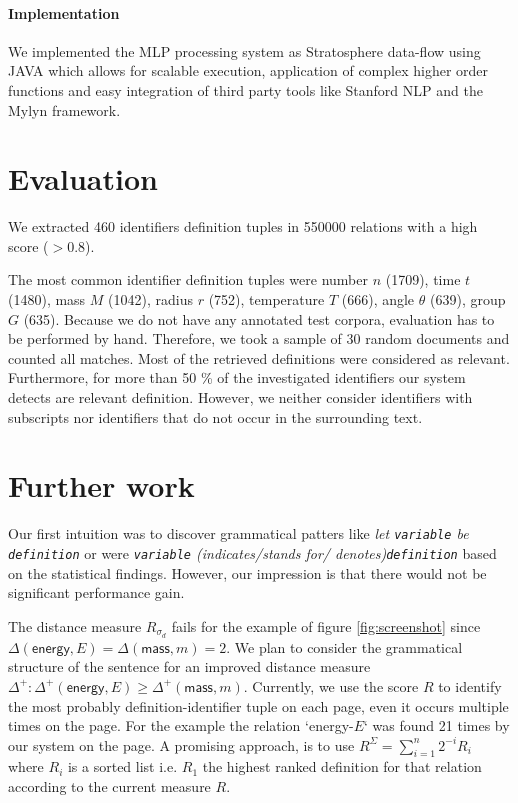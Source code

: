 \documentclass[runningheads]{llncs}
\begin{document}
\paragraph{Implementation}
We implemented the MLP processing system \cite{github} as Stratosphere data-flow using JAVA which allows for scalable execution, application of complex higher order functions and easy integration of third party tools like Stanford NLP and the Mylyn framework.
\section{Evaluation}
We extracted 460 identifiers definition tuples in 550000 relations with a
high score ($>0.8$).

The most common identifier definition tuples were 
number $n$ (1709), time $t$ (1480), mass $M$ (1042), radius $r$ (752), temperature	$T$	(666), angle $\theta$ (639), group $G$ (635).
Because we do not have any annotated test corpora,
evaluation has to be performed by hand.
Therefore, we took a sample of 30
random documents and counted all matches.
Most of the retrieved definitions were considered as relevant.
Furthermore, for more than 50 \% of the investigated identifiers our system detects are relevant definition.
However, we neither consider identifiers with subscripts nor identifiers that do not occur in the surrounding text.  



\section{Further work}
Our first intuition was to discover grammatical patters 
like \emph{let \texttt{variable} be \texttt{definition}} or 
were \emph{\texttt{variable} (indicates/stands for/ denotes)\texttt{definition}} based on the statistical findings.
However, our impression is that there would not be significant performance gain.

The distance measure
$R_{\sigma_d}$
fails for the example of figure \ref{fig:screenshot} since
$\Delta(\mathsf{energy},E)=\Delta(\mathsf{mass},m)=2$.
We plan to consider the grammatical structure of the sentence for an improved distance measure $\Delta^{+} : \Delta^+(\mathsf{energy},E)\ge\Delta^+(\mathsf{mass},m)$.
Currently, we use the score $R$ to identify the most probably definition-identifier tuple on each page, even it occurs multiple times on the page.
For the example the relation `energy-$E$` was found 21 times by our system on the page.
A promising approach, is to use $R^\Sigma=\sum_{i=1}^n 2^{-i} R_i $ where $R_i$ is a sorted list i.e. $R_1$ the highest ranked definition for that relation according to the current measure $R$.
\end{document}
